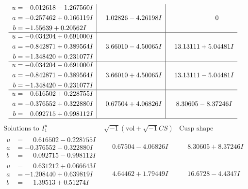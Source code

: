 \documentclass[1p]{elsarticle_modified}
\theoremstyle{definition}
\newcommand{\I}{\sqrt{-1}}
\begin{document}
$$\begin{array}{c|c|c}
\begin{aligned}
u &= -0.012618 - 1.267560 I \\
a &= -0.257462 + 0.166119 I \\
b &= -1.55639 + 0.20562 I\end{aligned}
 & \phantom{-}1.02826 - 4.26198 I & \phantom{-0.000000 } 0 \\ \hline\begin{aligned}
u &= -0.034204 + 0.691000 I \\
a &= -0.842871 + 0.389564 I \\
b &= -1.348420 + 0.231077 I\end{aligned}
 & \phantom{-}3.66010 - 4.50065 I & \phantom{-}13.13111 + 5.04481 I \\ \hline\begin{aligned}
u &= -0.034204 - 0.691000 I \\
a &= -0.842871 - 0.389564 I \\
b &= -1.348420 - 0.231077 I\end{aligned}
 & \phantom{-}3.66010 + 4.50065 I & \phantom{-}13.13111 - 5.04481 I \\ \hline\begin{aligned}
u &= \phantom{-}0.616502 + 0.228755 I \\
a &= -0.376552 + 0.322880 I \\
b &= \phantom{-}0.092715 + 0.998112 I\end{aligned}
 & \phantom{-}0.67504 + 4.06826 I & \phantom{-}8.30605 - 8.37246 I\\
 \hline 
 \end{array}$$\newpage$$\begin{array}{c|c|c}  
\text{Solutions to }I^u_{1}& \I (\text{vol} + \sqrt{-1}CS) & \text{Cusp shape}\\
 \hline 
\begin{aligned}
u &= \phantom{-}0.616502 - 0.228755 I \\
a &= -0.376552 - 0.322880 I \\
b &= \phantom{-}0.092715 - 0.998112 I\end{aligned}
 & \phantom{-}0.67504 - 4.06826 I & \phantom{-}8.30605 + 8.37246 I \\ \hline\begin{aligned}
u &= \phantom{-}0.631212 + 0.066643 I \\
a &= -1.208440 + 0.639819 I \\
b &= \phantom{-}1.39513 + 0.51274 I\end{aligned}
 & \phantom{-}4.64462 + 1.79449 I & \phantom{-}16.6728 - 4.4347 I \\ \hline\begin{aligned}

\end{aligned}
\end{array}$$
\end{document}
